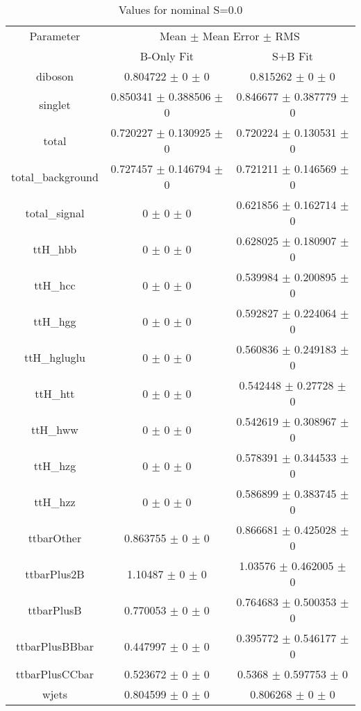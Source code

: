 \begin{table}
\centering
\caption{Values for nominal S=0.0}
\begin{tabular}{ccc}
\toprule
Parameter & \multicolumn{2}{c}{Mean $\pm$ Mean Error $\pm$ RMS}\\
 & B-Only Fit & S+B Fit\\
\midrule
diboson & \num{0.804722} $\pm$ \num{0} $\pm$ \num{0} & \num{0.815262} $\pm$ \num{0} $\pm$ \num{0}\\
singlet & \num{0.850341} $\pm$ \num{0.388506} $\pm$ \num{0} & \num{0.846677} $\pm$ \num{0.387779} $\pm$ \num{0}\\
total & \num{0.720227} $\pm$ \num{0.130925} $\pm$ \num{0} & \num{0.720224} $\pm$ \num{0.130531} $\pm$ \num{0}\\
total\_background & \num{0.727457} $\pm$ \num{0.146794} $\pm$ \num{0} & \num{0.721211} $\pm$ \num{0.146569} $\pm$ \num{0}\\
total\_signal & \num{0} $\pm$ \num{0} $\pm$ \num{0} & \num{0.621856} $\pm$ \num{0.162714} $\pm$ \num{0}\\
ttH\_hbb & \num{0} $\pm$ \num{0} $\pm$ \num{0} & \num{0.628025} $\pm$ \num{0.180907} $\pm$ \num{0}\\
ttH\_hcc & \num{0} $\pm$ \num{0} $\pm$ \num{0} & \num{0.539984} $\pm$ \num{0.200895} $\pm$ \num{0}\\
ttH\_hgg & \num{0} $\pm$ \num{0} $\pm$ \num{0} & \num{0.592827} $\pm$ \num{0.224064} $\pm$ \num{0}\\
ttH\_hgluglu & \num{0} $\pm$ \num{0} $\pm$ \num{0} & \num{0.560836} $\pm$ \num{0.249183} $\pm$ \num{0}\\
ttH\_htt & \num{0} $\pm$ \num{0} $\pm$ \num{0} & \num{0.542448} $\pm$ \num{0.27728} $\pm$ \num{0}\\
ttH\_hww & \num{0} $\pm$ \num{0} $\pm$ \num{0} & \num{0.542619} $\pm$ \num{0.308967} $\pm$ \num{0}\\
ttH\_hzg & \num{0} $\pm$ \num{0} $\pm$ \num{0} & \num{0.578391} $\pm$ \num{0.344533} $\pm$ \num{0}\\
ttH\_hzz & \num{0} $\pm$ \num{0} $\pm$ \num{0} & \num{0.586899} $\pm$ \num{0.383745} $\pm$ \num{0}\\
ttbarOther & \num{0.863755} $\pm$ \num{0} $\pm$ \num{0} & \num{0.866681} $\pm$ \num{0.425028} $\pm$ \num{0}\\
ttbarPlus2B & \num{1.10487} $\pm$ \num{0} $\pm$ \num{0} & \num{1.03576} $\pm$ \num{0.462005} $\pm$ \num{0}\\
ttbarPlusB & \num{0.770053} $\pm$ \num{0} $\pm$ \num{0} & \num{0.764683} $\pm$ \num{0.500353} $\pm$ \num{0}\\
ttbarPlusBBbar & \num{0.447997} $\pm$ \num{0} $\pm$ \num{0} & \num{0.395772} $\pm$ \num{0.546177} $\pm$ \num{0}\\
ttbarPlusCCbar & \num{0.523672} $\pm$ \num{0} $\pm$ \num{0} & \num{0.5368} $\pm$ \num{0.597753} $\pm$ \num{0}\\
wjets & \num{0.804599} $\pm$ \num{0} $\pm$ \num{0} & \num{0.806268} $\pm$ \num{0} $\pm$ \num{0}\\
\bottomrule
\end{tabular}
\end{table}